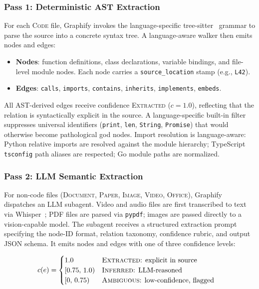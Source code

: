\subsubsection{Pass 1: Deterministic AST Extraction}

For each \textsc{Code} file, Graphify invokes the language-specific
tree-sitter~\cite{treesitter} grammar to parse the source into a concrete
syntax tree. A language-aware walker then emits nodes and edges:

\begin{itemize}
  \item \textbf{Nodes}: function definitions, class declarations, variable
        bindings, and file-level module nodes. Each node carries a
        \texttt{source\_location} stamp (e.g., \texttt{L42}).
  \item \textbf{Edges}: \texttt{calls}, \texttt{imports}, \texttt{contains},
        \texttt{inherits}, \texttt{implements}, \texttt{embeds}.
\end{itemize}

All AST-derived edges receive confidence \textsc{Extracted} ($c = 1.0$),
reflecting that the relation is syntactically explicit in the source. A
language-specific built-in filter suppresses universal identifiers
(\texttt{print}, \texttt{len}, \texttt{String}, \texttt{Promise}) that would
otherwise become pathological god nodes. Import resolution is language-aware:
Python relative imports are resolved against the module hierarchy; TypeScript
\texttt{tsconfig} path aliases are respected; Go module paths are normalized.

\subsubsection{Pass 2: LLM Semantic Extraction}

For non-code files (\textsc{Document}, \textsc{Paper}, \textsc{Image},
\textsc{Video}, \textsc{Office}), Graphify dispatches an LLM subagent.
Video and audio files are first transcribed to text via Whisper~\cite{whisper};
PDF files are parsed via \texttt{pypdf}; images are passed directly to a
vision-capable model. The subagent receives a structured extraction prompt
specifying the node-ID format, relation taxonomy, confidence rubric, and output
JSON schema. It emits nodes and edges with one of three confidence levels:

\begin{align}
  c(e) &= \begin{cases}
    1.0 & \text{\textsc{Extracted}: explicit in source} \\
    [0.75,\,1.0) & \text{\textsc{Inferred}: LLM-reasoned} \\
    [0,\,0.75) & \text{\textsc{Ambiguous}: low-confidence, flagged}
  \end{cases}
  \label{eq:confidence}
\end{align}

